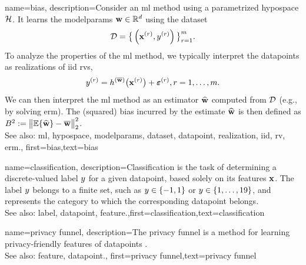 {
	name={bias},
	description={Consider an \gls{ml} method using a parametrized \gls{hypospace} $\mathcal{H}$. 
		It learns the \gls{modelparams} ${\bf w} \in \mathbb{R}^{d}$ using the \gls{dataset} $$ \mathcal{D}=\big\{ \left( {\bf x}^{(r)},y^{(r)} \right) \big\}_{r=1}^{m}.$$ 
		To analyze the properties of the \gls{ml} method, we typically interpret the \glspl{datapoint} as \glspl{realization} 
		of \gls{iid} \glspl{rv}, $$ y^{(r)} = h^{(\overline{{\bf w}})}\big( {\bf x}^{(r)} \big) + \bm{\varepsilon}^{(r)}, r=1,\ldots,m.$$ 
		We can then interpret the \gls{ml} method as an estimator $\widehat{{\bf w}}$ 
		computed from $\mathcal{D}$ (e.g., by solving \gls{erm}). The (squared) bias incurred by the estimate $\widehat{{\bf w}}$ 
		is then defined as $B^{2} := \big\| \mathbb{E} \{ \widehat{{\bf w}}  \}- \overline{{\bf w}}\big\|_{2}^{2}$.
					\\ 
		See also: \gls{ml}, \gls{hypospace}, \gls{modelparams}, \gls{dataset}, \gls{datapoint}, \gls{realization}, \gls{iid}, \gls{rv}, \gls{erm}.},
first={bias},text={bias} 
}

{name={classification},
 description={Classification is the task of determining a 
 	discrete-valued \gls{label} $y$ for a given \gls{datapoint}, based solely on its 
 	\glspl{feature} ${\bf x}$. The \gls{label} $y$ belongs to a finite set, such as 
 	$y \in \{-1,1\}$ or $y \in \{1,\ldots,19\}$, and represents the 
 	category to which the corresponding \gls{datapoint} belongs.
				\\ 
		See also: \gls{label}, \gls{datapoint}, \gls{feature}.},first={classification},text={classification} 
}



{name={privacy funnel},
 description={The privacy funnel is a method for learning privacy-friendly \glspl{feature} 
	of \glspl{datapoint} \cite{PrivacyFunnel}.
				\\ 
		See also: \gls{feature}, \gls{datapoint}.},
 first={privacy funnel},text={privacy funnel} 
}




